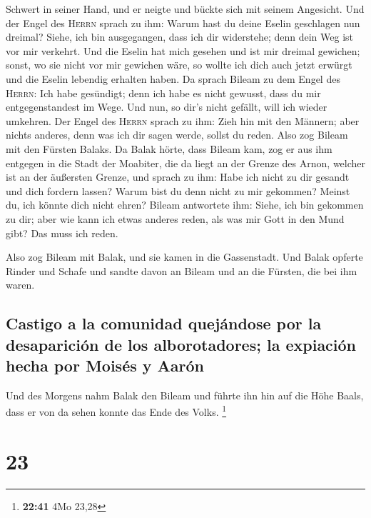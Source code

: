Schwert in seiner Hand, und er neigte und bückte sich mit seinem
Angesicht.  Und der Engel des \textsc{Herrn} sprach zu
ihm: Warum hast du deine Eselin geschlagen nun dreimal? Siehe, ich bin
ausgegangen, dass ich dir widerstehe; denn dein Weg ist vor mir
verkehrt.  Und die Eselin hat mich gesehen und ist mir
dreimal gewichen; sonst, wo sie nicht vor mir gewichen wäre, so wollte
ich dich auch jetzt erwürgt und die Eselin lebendig erhalten haben.
 Da sprach Bileam zu dem Engel des \textsc{Herrn}: Ich
habe gesündigt; denn ich habe es nicht gewusst, dass du mir
entgegenstandest im Wege. Und nun, so dir's nicht gefällt, will ich
wieder umkehren.  Der Engel des \textsc{Herrn} sprach zu
ihm: Zieh hin mit den Männern; aber nichts anderes, denn was ich dir
sagen werde, sollst du reden. Also zog Bileam mit den Fürsten Balaks.
 Da Balak hörte, dass Bileam kam, zog er aus ihm entgegen
in die Stadt der Moabiter, die da liegt an der Grenze des Arnon, welcher
ist an der äußersten Grenze,  und sprach zu ihm: Habe ich
nicht zu dir gesandt und dich fordern lassen? Warum bist du denn nicht
zu mir gekommen? Meinst du, ich könnte dich nicht ehren? 
Bileam antwortete ihm: Siehe, ich bin gekommen zu dir; aber wie kann ich
etwas anderes reden, als was mir Gott in den Mund gibt? Das muss ich
reden.

 Also zog Bileam mit Balak, und sie kamen in die
Gassenstadt.  Und Balak opferte Rinder und Schafe und
sandte davon an Bileam und an die Fürsten, die bei ihm waren.

\hypertarget{castigo-a-la-comunidad-quejuxe1ndose-por-la-desapariciuxf3n-de-los-alborotadores-la-expiaciuxf3n-hecha-por-moisuxe9s-y-aaruxf3n}{%
\subsection{Castigo a la comunidad quejándose por la desaparición de los
alborotadores; la expiación hecha por Moisés y
Aarón}\label{castigo-a-la-comunidad-quejuxe1ndose-por-la-desapariciuxf3n-de-los-alborotadores-la-expiaciuxf3n-hecha-por-moisuxe9s-y-aaruxf3n}}

 Und des Morgens nahm Balak den Bileam und führte ihn hin
auf die Höhe Baals, dass er von da sehen konnte das Ende des Volks.
\footnote{\textbf{22:41} 4Mo 23,28}

\hypertarget{section-22}{%
\section{23}\label{section-22}}

